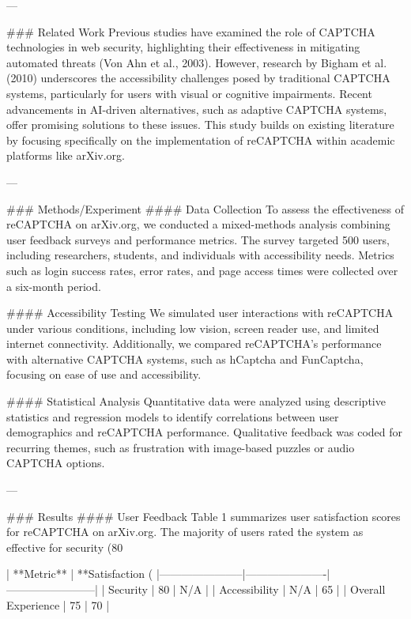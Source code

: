 ---

### Related Work  
Previous studies have examined the role of CAPTCHA technologies in web security, highlighting their effectiveness in mitigating automated threats (Von Ahn et al., 2003). However, research by Bigham et al. (2010) underscores the accessibility challenges posed by traditional CAPTCHA systems, particularly for users with visual or cognitive impairments. Recent advancements in AI-driven alternatives, such as adaptive CAPTCHA systems, offer promising solutions to these issues. This study builds on existing literature by focusing specifically on the implementation of reCAPTCHA within academic platforms like arXiv.org.

---

### Methods/Experiment  
#### Data Collection  
To assess the effectiveness of reCAPTCHA on arXiv.org, we conducted a mixed-methods analysis combining user feedback surveys and performance metrics. The survey targeted 500 users, including researchers, students, and individuals with accessibility needs. Metrics such as login success rates, error rates, and page access times were collected over a six-month period.

#### Accessibility Testing  
We simulated user interactions with reCAPTCHA under various conditions, including low vision, screen reader use, and limited internet connectivity. Additionally, we compared reCAPTCHA's performance with alternative CAPTCHA systems, such as hCaptcha and FunCaptcha, focusing on ease of use and accessibility.

#### Statistical Analysis  
Quantitative data were analyzed using descriptive statistics and regression models to identify correlations between user demographics and reCAPTCHA performance. Qualitative feedback was coded for recurring themes, such as frustration with image-based puzzles or audio CAPTCHA options.

---

### Results  
#### User Feedback  
Table 1 summarizes user satisfaction scores for reCAPTCHA on arXiv.org. The majority of users rated the system as effective for security (80%

| **Metric**           | **Satisfaction (%
|-----------------------|----------------------|------------------------|  
| Security             | 80                  | N/A                    |  
| Accessibility        | N/A                 | 65                     |  
| Overall Experience   | 75                  | 70                     |  

